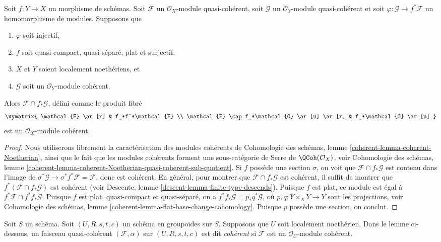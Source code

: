 \begin{lemma}
\label{lemma-push-pull}
Soit $f : Y \to X$ un morphisme de schémas. Soit $\mathcal{F}$
un $\mathcal{O}_X$-module quasi-cohérent, soit $\mathcal{G}$
un $\mathcal{O}_Y$-module quasi-cohérent et soit
$\varphi : \mathcal{G} \to f^*\mathcal{F}$ un homomorphisme de modules. Supposons que
\begin{enumerate}
\item $\varphi$ soit injectif,
\item $f$ soit quasi-compact, quasi-séparé, plat et surjectif,
\item $X$ et $Y$ soient localement noethériens, et
\item $\mathcal{G}$ soit un $\mathcal{O}_Y$-module cohérent.
\end{enumerate}
Alors $\mathcal{F} \cap f_*\mathcal{G}$, défini comme le produit fibré
$$
\xymatrix{
\mathcal{F} \ar[r] & f_*f^*\mathcal{F} \\
\mathcal{F} \cap f_*\mathcal{G} \ar[u] \ar[r] &
f_*\mathcal{G} \ar[u]
}
$$
est un $\mathcal{O}_X$-module cohérent.
\end{lemma}

\begin{proof}
Nous utiliserons librement la caractérisation des modules cohérents de
Cohomologie des schémas, lemme \ref{coherent-lemma-coherent-Noetherian},
ainsi que le fait que les modules cohérents forment une sous-catégorie de Serre
de $\QCoh(\mathcal{O}_X)$, voir
Cohomologie des schémas,
lemme \ref{coherent-lemma-coherent-Noetherian-quasi-coherent-sub-quotient}.
Si $f$ possède une section $\sigma$, on voit que
$\mathcal{F} \cap f_*\mathcal{G}$ est contenu dans l'image de
$\sigma^*\mathcal{G} \to \sigma^*f^*\mathcal{F} = \mathcal{F}$,
donc est cohérent. En général, pour montrer que $\mathcal{F} \cap f_*\mathcal{G}$
est cohérent, il suffit de montrer que
$f^*(\mathcal{F} \cap f_*\mathcal{G})$ est cohérent (voir
Descente, lemme \ref{descent-lemma-finite-type-descends}).
Puisque $f$ est plat, ce module est égal à $f^*\mathcal{F} \cap f^*f_*\mathcal{G}$.
Puisque $f$ est plat, quasi-compact et quasi-séparé, on a
$f^*f_*\mathcal{G} = p_*q^*\mathcal{G}$, où $p, q : Y \times_X Y \to Y$
sont les projections, voir
Cohomologie des schémas, lemme \ref{coherent-lemma-flat-base-change-cohomology}.
Puisque $p$ possède une section, on conclut.
\end{proof}

\noindent
Soit $S$ un schéma. Soit $(U, R, s, t, c)$ un schéma en groupoïdes sur $S$.
Supposons que $U$ soit localement noethérien. Dans le lemme ci-dessous, un
faisceau quasi-cohérent $(\mathcal{F}, \alpha)$ sur $(U, R, s, t, c)$ est dit
{\it cohérent} si $\mathcal{F}$ est un $\mathcal{O}_U$-module cohérent.


